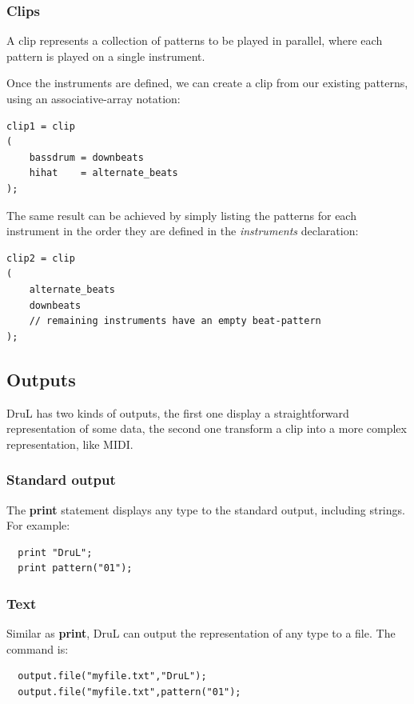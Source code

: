 \documentclass[11pt,twoside]{article}
\begin{document}
\subsubsection{Clips}

A clip represents a collection of patterns to be played in parallel, where each pattern is played on a single instrument.

Once the instruments are defined, we can create a clip from our existing patterns, using an
associative-array notation:

\begin{verbatim}
clip1 = clip
(
    bassdrum = downbeats
    hihat    = alternate_beats
);
\end{verbatim}

The same result can be achieved by simply listing the patterns for each instrument in the order they are defined in the \textit{instruments} declaration:
\begin{verbatim}
clip2 = clip
(
    alternate_beats
    downbeats
    // remaining instruments have an empty beat-pattern
);

\end{verbatim}




\subsection{Outputs}
DruL has two kinds of outputs, the first one display a straightforward
representation of some data, the second one transform a clip into a
more complex representation, like MIDI.

\subsubsection{Standard output}
The \textbf{print} statement displays any type to the standard
output, including strings. For example:
\begin{verbatim}
  print "DruL";
  print pattern("01");
\end{verbatim}

\subsubsection{Text}
Similar as \textbf{print}, DruL can output the representation of any type 
to a file. The command is:
\begin{verbatim}
  output.file("myfile.txt","DruL");
  output.file("myfile.txt",pattern("01");
\end{verbatim}
\end{document}
